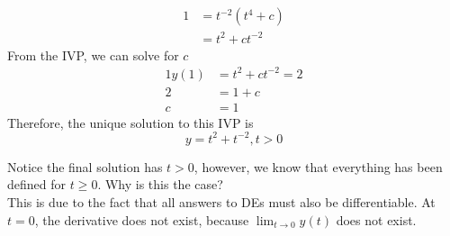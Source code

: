 \documentclass[diffeq.tex]{subfiles}
\begin{document}
\begin{example}
\begin{alignat}{1}
            &= t^{-2}(t^{4} + c)\\
            &= t^{2} + ct^{-2}
        \end{alignat}
        From the IVP, we can solve for $c$
        \begin{alignat}{1}
            y(1) &= t^{2} + ct^{-2} = 2\\
            2 &= 1 + c\\
            c &= 1
        \end{alignat}
        Therefore, the unique solution to this IVP is
        \begin{equation}
            y = t^{2} + t^{-2}, t > 0
        \end{equation}
    \end{example}
    \begin{remark}
        Notice the final solution has $t > 0$, however, we know that everything has been defined for $t \geq 0$. Why is this the case?\\[1em]
        This is due to the fact that all answers to DEs must also be differentiable. At $t = 0$, the derivative does not exist, because $\lim_{t\to0}y(t)$ does not exist.
    \end{remark}
\end{document}
